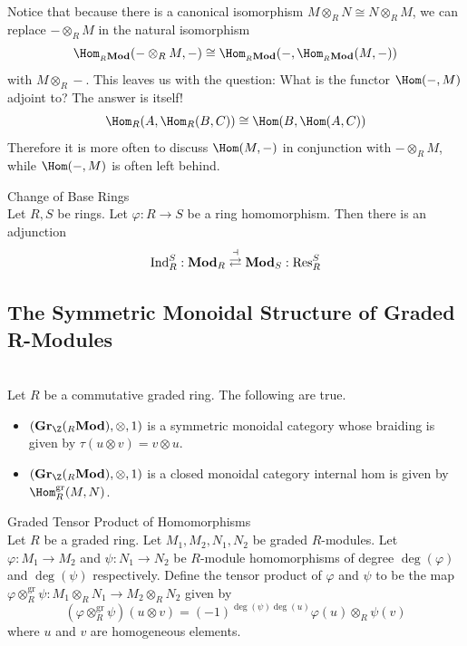 \documentclass[a4paper]{article}
\begin{document}
Notice that because there is a canonical isomorphism $M\otimes_RN\cong N\otimes_RM$, we can replace $-\otimes_RM$ in the natural isomorphism $$\Hom_{_R\bold{Mod}}(-\otimes_RM,-)\cong\Hom_{_R\bold{Mod}}(-,\Hom_{_R\bold{Mod}}(M,-))$$ with $M\otimes_R-$. This leaves us with the question: What is the functor $\Hom(-,M)$ adjoint to? The answer is itself! $$\Hom_R(A,\Hom_R(B,C))\cong\Hom(B,\Hom(A,C))$$ Therefore it is more often to discuss $\Hom(M,-)$ in conjunction with $-\otimes_RM$, while $\Hom(-,M)$ is often left behind. 

\begin{thm}{Change of Base Rings}{}\\
Let $R,S$ be rings. Let $\varphi:R\to S$ be a ring homomorphism. Then there is an adjunction $$\text{Ind}_R^S:\bold{Mod}_R\overset{\dashv}{\rightleftarrows}\bold{Mod}_S:\text{Res}_R^S$$
\end{thm}

\subsection{The Symmetric Monoidal Structure of Graded R-Modules}
\begin{prp}{}{}\\
Let $R$ be a commutative graded ring. The following are true. 
\begin{itemize}
\item $(\bold{Gr}_\Z({_R\bold{Mod}}),\otimes,1)$ is a symmetric monoidal category whose braiding is given by $\tau(u\otimes v)=v\otimes u$. 
\item $(\bold{Gr}_\Z({_R\bold{Mod}}),\otimes,1)$ is a closed monoidal category internal hom is given by $\Hom_R^\text{gr}(M,N)$. 
\end{itemize}
\end{prp}

\begin{defn}{Graded Tensor Product of Homomorphisms}{}\\
Let $R$ be a graded ring. Let $M_1,M_2,N_1,N_2$ be graded $R$-modules. Let $\varphi:M_1\to M_2$ and $\psi:N_1\to N_2$ be $R$-module homomorphisms of degree $\deg(\varphi)$ and $\deg(\psi)$ respectively. Define the tensor product of $\varphi$ and $\psi$ to be the map $\varphi\otimes_R^\text{gr}\psi:M_1\otimes_R N_1\to M_2\otimes_R N_2$ given by $$(\varphi\otimes_R^\text{gr}\psi)(u\otimes v)=(-1)^{\deg(\psi)\deg(u)}
\varphi(u)\otimes_R\psi(v)$$ where $u$ and $v$ are homogeneous elements. 
\end{defn}
\end{document}

